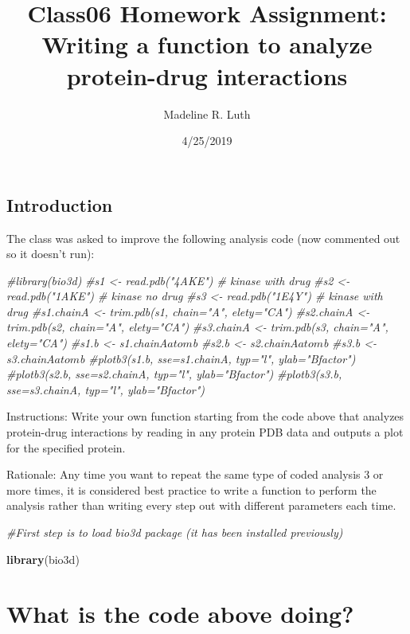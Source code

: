 \documentclass[]{article}
\title{Class06 Homework Assignment: Writing a function to analyze protein-drug
interactions}
\author{Madeline R. Luth}
\date{4/25/2019}
\newenvironment{Shaded}{\begin{snugshade}}{\end{snugshade}}
\newcommand{\KeywordTok}[1]{\textcolor[rgb]{0.13,0.29,0.53}{\textbf{{#1}}}}
\newcommand{\CommentTok}[1]{\textcolor[rgb]{0.56,0.35,0.01}{\textit{{#1}}}}
\newcommand{\NormalTok}[1]{{#1}}
\begin{document}
\maketitle

\subsection{Introduction}\label{introduction}

The class was asked to improve the following analysis code (now
commented out so it doesn't run):

\begin{Shaded}
\begin{Highlighting}[]
\CommentTok{#library(bio3d)}
\CommentTok{#s1 <- read.pdb("4AKE")  # kinase with drug}
\CommentTok{#s2 <- read.pdb("1AKE")  # kinase no drug}
\CommentTok{#s3 <- read.pdb("1E4Y")  # kinase with drug}
\CommentTok{#s1.chainA <- trim.pdb(s1, chain="A", elety="CA")}
\CommentTok{#s2.chainA <- trim.pdb(s2, chain="A", elety="CA")}
\CommentTok{#s3.chainA <- trim.pdb(s3, chain="A", elety="CA")}
\CommentTok{#s1.b <- s1.chainA$atom$b}
\CommentTok{#s2.b <- s2.chainA$atom$b}
\CommentTok{#s3.b <- s3.chainA$atom$b}
\CommentTok{#plotb3(s1.b, sse=s1.chainA, typ="l", ylab="Bfactor")}
\CommentTok{#plotb3(s2.b, sse=s2.chainA, typ="l", ylab="Bfactor")}
\CommentTok{#plotb3(s3.b, sse=s3.chainA, typ="l", ylab="Bfactor")}
\end{Highlighting}
\end{Shaded}

Instructions: Write your own function starting from the code above that
analyzes protein-drug interactions by reading in any protein PDB data
and outputs a plot for the specified protein.

Rationale: Any time you want to repeat the same type of coded analysis 3
or more times, it is considered best practice to write a function to
perform the analysis rather than writing every step out with different
parameters each time.

\begin{Shaded}
\begin{Highlighting}[]
\CommentTok{#First step is to load bio3d package (it has been installed previously)}

\KeywordTok{library}\NormalTok{(bio3d)}
\end{Highlighting}
\end{Shaded}

\section{What is the code above
doing?}\label{what-is-the-code-above-doing}
\end{document}
